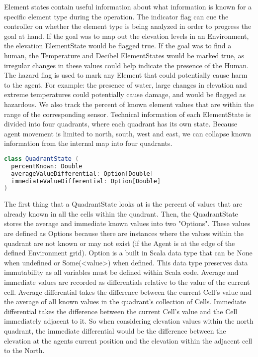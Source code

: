 Element states contain useful information about what information is known for a specific element type during the operation.
The indicator flag can cue the controller on whether the element type is being analyzed in order to progress the goal at hand.
If the goal was to map out the elevation levels in an Environment, the elevation ElementState would be flagged true.
If the goal was to find a human, the Temperature and Decibel ElementStates would be marked true, as irregular changes in these values could help indicate the presence of the Human.
The hazard flag is used to mark any Element that could potentially cause harm to the agent.
For example: the presence of water, large changes in elevation and extreme temperatures could potentially cause damage, and would be flagged as hazardous.
We also track the percent of known element values that are within the range of the corresponding sensor.
Technical information of each ElementState is divided into four quadrants, where each quadrant has its own state.
Because agent movement is limited to north, south, west and east, we can collapse known information from the internal map into four quadrants. 

\begin{lstlisting}[language=Scala]
class QuadrantState (
  percentKnown: Double
  averageValueDifferential: Option[Double]
  immediateValueDifferential: Option[Double]
)
\end{lstlisting}

The first thing that a QuadrantState looks at is the percent of values that are already known in all the cells within the quadrant.
Then, the QuadrantState stores the average and immediate known values into two "Options".
These values are defined as Options because there are instances where the values within the quadrant are not known or may not exist (if the Agent is at the edge of the defined Environment grid).
Option is a built in Scala data type that can be None when undefined or Some(<value>) when defined.
This data type preserves data immutability as all variables must be defined within Scala code.
Average and immediate values are recorded as differentials relative to the value of the current cell.
Average differential takes the difference between the current Cell's value and the average of all known values in the quadrant's collection of Cells.
Immediate differential takes the difference between the current Cell's value and the Cell immediately adjacent to it.
So when considering elevation values within the north quadrant, the immediate differential would be the difference between the elevation at the agents current position and the elevation within the adjacent cell to the North.


